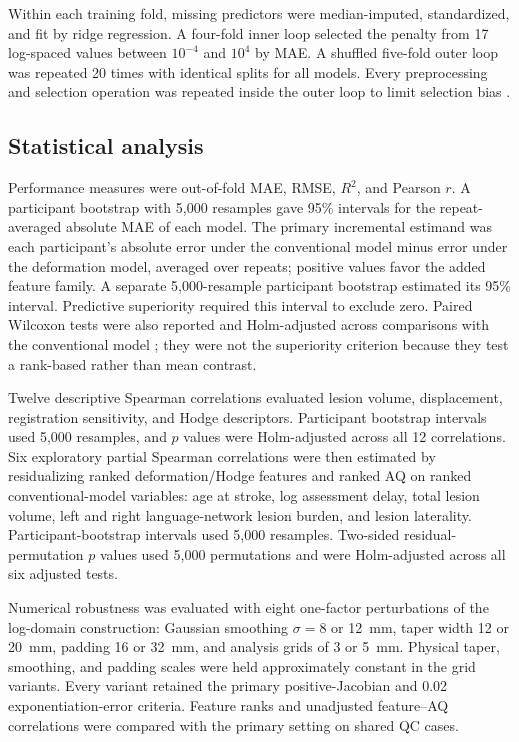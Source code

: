 \documentclass[11pt]{article}
\begin{document}
Within each training fold, missing predictors were median-imputed,
standardized, and fit by ridge regression. A four-fold inner loop selected the
penalty from 17 log-spaced values between $10^{-4}$ and $10^4$ by MAE. A
shuffled five-fold outer loop was repeated 20 times with identical splits for
all models. Every preprocessing and selection operation was repeated inside the
outer loop to limit selection bias \citep{Varma2006}.

\subsection{Statistical analysis}

Performance measures were out-of-fold MAE, RMSE, $R^2$, and Pearson $r$. A
participant bootstrap with 5,000 resamples gave 95\% intervals for the
repeat-averaged absolute MAE of each model. The primary incremental estimand was
each participant's absolute error under the conventional model minus error
under the deformation model, averaged over repeats; positive values favor the
added feature family. A separate 5,000-resample participant bootstrap estimated
its 95\% interval. Predictive superiority required this interval to exclude
zero. Paired Wilcoxon tests were also reported and Holm-adjusted across
comparisons with the conventional model \citep{Holm1979}; they were not the
superiority criterion because they test a rank-based rather than mean
contrast.

Twelve descriptive Spearman correlations evaluated lesion volume,
displacement, registration sensitivity, and Hodge descriptors. Participant
bootstrap intervals used 5,000 resamples, and $p$ values were Holm-adjusted
across all 12 correlations. Six exploratory partial Spearman correlations were
then estimated by residualizing ranked deformation/Hodge features and ranked AQ
on ranked conventional-model variables: age at stroke, log assessment delay,
total lesion volume, left and right language-network lesion burden, and lesion
laterality. Participant-bootstrap intervals used 5,000 resamples. Two-sided
residual-permutation $p$ values used 5,000 permutations and were Holm-adjusted
across all six adjusted tests.

Numerical robustness was evaluated with eight one-factor perturbations of the
log-domain construction: Gaussian smoothing $\sigma=8$ or 12~mm, taper width 12
or 20~mm, padding 16 or 32~mm, and analysis grids of 3 or 5~mm. Physical taper,
smoothing, and padding scales were held approximately constant in the grid
variants. Every variant retained the primary positive-Jacobian and 0.02
exponentiation-error criteria. Feature ranks and unadjusted feature--AQ
correlations were compared with the primary setting on shared QC cases.
\end{document}
